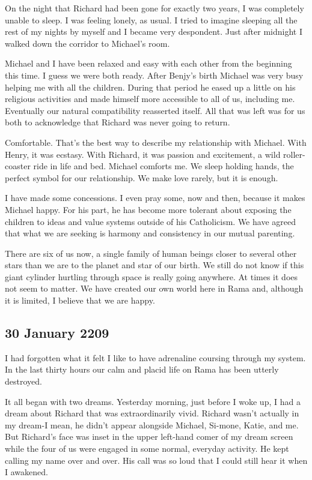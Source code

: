 \documentclass[]{article}
\begin{document}
On the night that Richard had been gone for exactly two years, I was completely unable to sleep. I was feeling lonely, as usual. I tried to imagine sleeping all the rest of my nights by myself and I became very despondent. Just after midnight I walked down the corridor to Michael’s room.

Michael and I have been relaxed and easy with each other from the beginning this time. I guess we were both ready. After Benjy’s birth Michael was very busy helping me with all the children. During that period he eased up a little on his religious activities and made himself more accessible to all of us, including me. Eventually our natural compatibility reasserted itself. All that was left was for us both to acknowledge that Richard was never going to return.

Comfortable. That’s the best way to describe my relationship with Michael. With Henry, it was ecstasy. With Richard, it was passion and excitement, a wild roller-coaster ride in life and bed. Michael comforts me. We sleep holding hands, the perfect symbol for our relationship. We make love rarely, but it is enough.

I have made some concessions. I even pray some, now and then, because it makes Michael happy. For his part, he has become more tolerant about exposing the children to ideas and value systems outside of his Catholicism. We have agreed that what we are seeking is harmony and consistency in our mutual parenting.

There are six of us now, a single family of human beings closer to several other stars than we are to the planet and star of our birth. We still do not know if this giant cylinder hurtling through space is really going anywhere. At times it does not seem to matter. We have created our own world here in Rama and, although it is limited, I believe that we are happy.

\subsection{30 January 2209}

I had forgotten what it felt I like to have adrenaline coursing through my system. In the last thirty hours our calm and placid life on Rama has been utterly destroyed.

It all began with two dreams. Yesterday morning, just before I woke up, I had a dream about Richard that was extraordinarily vivid. Richard wasn’t actually in my dream-I mean, he didn’t appear alongside Michael, Si-mone, Katie, and me. But Richard’s face was inset in the upper left-hand comer of my dream screen while the four of us were engaged in some normal, everyday activity. He kept calling my name over and over. His call was so loud that I could still hear it when I awakened.
\end{document}
